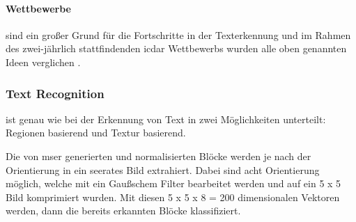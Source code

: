 \paragraph{Wettbewerbe}\label{ICDAR} sind ein großer Grund für die Fortschritte in der Texterkennung und im Rahmen des zwei-jährlich stattfindenden \Gls{icdar} Wettbewerbs wurden alle oben genannten Ideen verglichen \cite{ICDAR:online}.

\subsubsection{Text Recognition} ist genau wie bei der Erkennung von Text in zwei Möglichkeiten unterteilt: Regionen basierend und Textur basierend.

Die von \gls{mser} generierten und normalisierten Blöcke werden je nach der Orientierung in ein seerates Bild extrahiert. Dabei sind acht Orientierung möglich, welche mit ein Gaußschem Filter bearbeitet werden und auf ein 5 x 5 Bild komprimiert wurden. Mit diesen 5 x 5 x 8 = 200 dimensionalen Vektoren werden, dann die bereits erkannten Blöcke klassifiziert. \cite{SWT:online}
